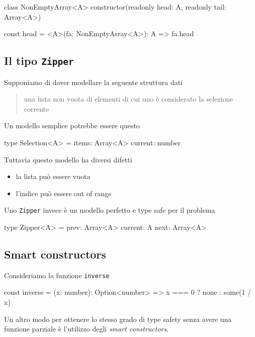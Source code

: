\documentclass[12pt]{article}
\theoremstyle{definition}
\newenvironment{code}
  {\vspace{0.5cm} \VerbatimEnvironment\begin{typescriptcode}}
  {\end{typescriptcode} \vspace{0.2cm}}
\begin{document}
\begin{code}
class NonEmptyArray<A> {
  constructor(readonly head: A, readonly tail: Array<A>) {}
}

const head = <A>(fa: NonEmptyArray<A>): A => fa.head
\end{code}

\subsection{Il tipo \texttt{Zipper}}

Supponiamo di dover modellare la seguente struttura dati

\begin{quote}
una lista non vuota di elementi di cui uno è considerato la selezione corrente
\end{quote}

Un modello semplice potrebbe essere questo

\begin{code}
type Selection<A> = {
  items: Array<A>
  current: number
}
\end{code}

Tuttavia questo modello ha diversi difetti

\begin{itemize}
  \item la lista può essere vuota
  \item l'indice può essere out of range
\end{itemize}

Uno \texttt{Zipper} invece è un modello perfetto e type safe per il problema

\begin{code}
type Zipper<A> = {
  prev: Array<A>
  current: A
  next: Array<A>
}
\end{code}

\subsection{Smart constructors}

Consideriamo la funzione \texttt{inverse}

\begin{code}
const inverse = (x: number): Option<number> =>
  x === 0 ? none : some(1 / x)
\end{code}

Un altro modo per ottenere lo stesso grado di type safety senza avere una funzione parziale è l'utilizzo degli \emph{smart constructors}.
\end{document}
